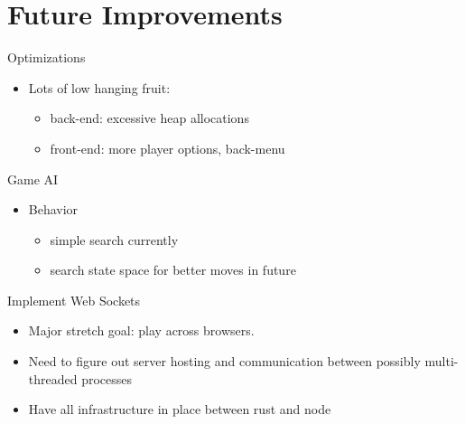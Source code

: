 \documentclass[allowframebreaks]{beamer}
\begin{document}
\section{Future Improvements}
\label{sec:orgc94ef9d}
\begin{frame}[label={sec:orgf9f68af}]{Optimizations}
\begin{itemize}
\item Lots of low hanging fruit:
\begin{itemize}
\item back-end: excessive heap allocations
\item front-end: more player options, back-menu
\end{itemize}
\end{itemize}
\end{frame}
\begin{frame}[label={sec:orga56bf2a}]{Game AI}
\begin{itemize}
\item Behavior
\begin{itemize}
\item simple search currently
\item search state space for better moves in future
\end{itemize}
\end{itemize}
\end{frame}
\begin{frame}[label={sec:org4e7752f}]{Implement Web Sockets}
\begin{itemize}
\item Major stretch goal: play across browsers.
\item Need to figure out server hosting and communication between possibly multi-threaded processes
\item Have all infrastructure in place between rust and node
\end{itemize}
\end{frame}
\end{document}
